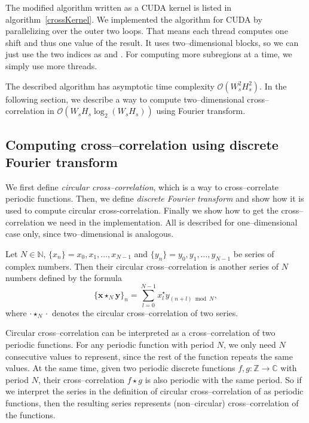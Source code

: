 The modified algorithm written as a CUDA kernel is listed in algorithm~\ref{crossKernel}. We implemented the algorithm for CUDA by parallelizing over the outer two loops. That means each thread computes one shift and thus one value of the result. It uses two--dimensional blocks, so we can just use the two indices as  and . For computing more subregions at a time, we simply use more threads.

The described algorithm has asymptotic time complexity $\mathcal{O}(W_s^2H_s^2)$. In the following section, we describe a way to compute two--dimensional cross--correlation in $\mathcal{O}(W_sH_s\log_2(W_sH_s))$ using Fourier transform.

\subsection{Computing cross--correlation using discrete \\ Fourier transform}
\label{fft}

We first define \emph{circular cross--correlation}, which is a way to cross--correlate periodic functions. Then, we define \emph{discrete Fourier transform} and show how it is used to compute circular cross-correlation. Finally we show how to get the cross--correlation we need in the implementation. All is described for one--dimensional case only, since two--dimensional is analogous.

Let $N \in \mathbb{N}$, $\{x_n\} = x_0, x_1, \dots , x_{N-1}$ and $\{y_n\} = y_0, y_1, \dots , y_{N-1}$ be series of complex numbers. Then their circular cross--correlation is another series of $N$ numbers defined by the formula
\[
\{\mathbf{x} \star_N \mathbf{y}\}_n = \sum_{l=0}^{N-1}x^\star_ly_{(n+l)\bmod N},
\]
where $\cdot \star_N \cdot$ denotes the circular cross--correlation of two series.

Circular cross--correlation can be interpreted as a cross--correlation of two periodic functions. For any periodic function with period $N$, we only need $N$ consecutive values to represent, since the rest of the function repeats the same values. At the same time, given two periodic discrete functions $f, g : \mathbb{Z} \rightarrow \mathbb{C}$ with period $N$, their cross--correlation $f \star g$ is also periodic with the same period. So if we interpret the series in the definition of circular cross--correlation of as periodic functions, then the resulting series represents (non--circular) cross--correlation of the functions.

